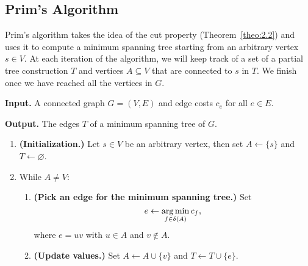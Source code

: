 \subsection{Prim's Algorithm}\label{subsec:2.3}
Prim's algorithm takes the idea of the cut property (Theorem~\ref{theo:2.2}) 
and uses it to compute a minimum spanning tree starting from an arbitrary 
vertex $s \in V$. At each iteration of the algorithm, we will keep track of a 
set of a partial tree construction $T$ and vertices $A \subseteq V$ that are 
connected to $s$ in $T$. We finish once we have reached all the vertices in $G$.

\begin{mdframed}[
    linewidth=1pt,
    linecolor=black,
    bottomline=false,topline=false,rightline=false,
    innerrightmargin=0pt,innertopmargin=0pt,innerbottommargin=0pt,
    innerleftmargin=1em,%
    skipabove=0.75\baselineskip
]
{\bf Input.} A connected graph $G = (V, E)$ and edge costs $c_e$ for 
all $e \in E$. 

{\bf Output.} The edges $T$ of a minimum spanning tree of $G$.
\begin{enumerate}[leftmargin=1.75cm, label={Step \arabic*.}]
    \item {\bf (Initialization.)} Let $s \in V$ be an arbitrary vertex, 
    then set $A \gets \{s\}$ and $T \gets \varnothing$.

    \item While $A \neq V$:
    \begin{enumerate}[label={Step 2.\arabic*.}]
        \item {\bf (Pick an edge for the minimum spanning tree.)} 
        Set 
        \[ e \gets \operatorname*{arg\,min}_{f \in \delta(A)} c_f, \] 
        where $e = uv$ with $u \in A$ and $v \notin A$.  
        \item {\bf (Update values.)} Set $A \gets A \cup \{v\}$ and 
        $T \gets T \cup \{e\}$. 
    \end{enumerate}
\end{enumerate}
\end{mdframed}\vspace{-0.15cm}

